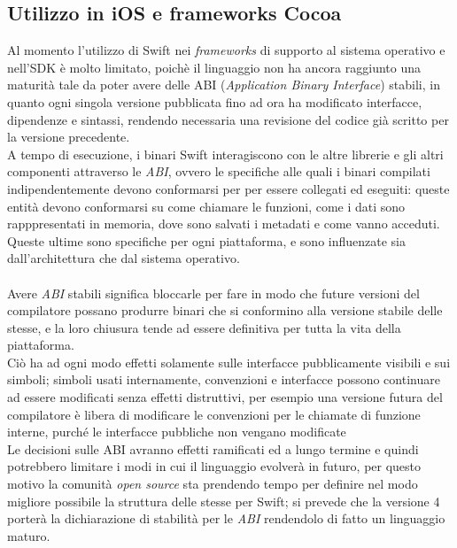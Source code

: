 \subsection{Utilizzo in iOS e frameworks Cocoa}
Al momento l'utilizzo di Swift nei \textit{frameworks} di supporto al sistema operativo e nell'SDK è molto limitato, poichè il linguaggio non ha ancora raggiunto una maturità tale da poter avere delle ABI (\textit{Application Binary Interface}) stabili, in quanto ogni singola versione pubblicata fino ad ora ha modificato interfacce, dipendenze e sintassi, rendendo necessaria una revisione del codice già scritto per la versione precedente.\\
A tempo di esecuzione, i binari Swift interagiscono con le altre librerie e gli altri componenti attraverso le \textit{ABI}, ovvero le specifiche alle quali i binari compilati indipendentemente devono conformarsi per per essere collegati ed eseguiti: queste entità devono conformarsi su come chiamare le funzioni, come i dati sono rapppresentati in memoria, dove sono salvati i metadati e come vanno acceduti.\\
Queste ultime sono specifiche per ogni piattaforma, e sono influenzate sia dall'architettura che dal sistema operativo.\\\\
Avere \textit{ABI} stabili significa bloccarle per fare in modo che future versioni del compilatore possano produrre binari che si conformino alla versione stabile delle stesse, e la loro chiusura tende ad essere definitiva per tutta la vita della piattaforma.\\Ciò ha ad ogni modo effetti solamente sulle interfacce pubblicamente visibili e sui simboli; simboli usati internamente, convenzioni e interfacce possono continuare ad essere modificati senza effetti distruttivi, per esempio una versione futura del compilatore è libera di modificare le convenzioni per le chiamate di funzione interne, purché le interfacce pubbliche non vengano modificate\\
Le decisioni sulle ABI avranno effetti ramificati ed a lungo termine e quindi potrebbero limitare i modi in cui il linguaggio evolverà in futuro, per questo motivo la comunità \textit{open source} sta prendendo tempo per definire nel modo migliore possibile la struttura delle stesse per Swift; si prevede che la versione 4 porterà la dichiarazione di stabilità per le \textit{ABI} rendendolo di fatto un linguaggio maturo.